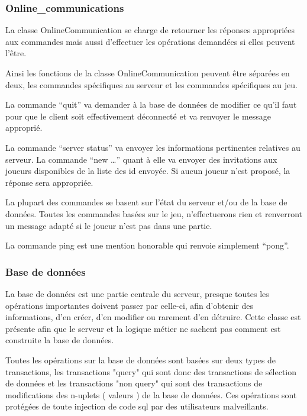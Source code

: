 \documentclass[11pt]{article}
\begin{document}
\subsubsection{Online\_communications}

La classe OnlineCommunication se charge de retourner les réponses appropriées aux commandes mais aussi d’effectuer les opérations demandées si elles peuvent l’être.

Ainsi les fonctions de la classe OnlineCommunication peuvent être séparées en deux, les commandes spécifiques au serveur et les commandes spécifiques au jeu.

La commande “quit” va demander à la base de données de modifier ce qu’il faut pour que le client soit effectivement déconnecté et va renvoyer le message approprié.

La commande “server status” va envoyer les informations pertinentes relatives au serveur.
La commande “new …” quant à elle va envoyer des invitations aux joueurs disponibles de la liste des id envoyée. Si aucun joueur n’est proposé, la réponse sera appropriée.

La plupart des commandes se basent sur l’état du serveur et/ou de la base de données.
Toutes les commandes basées sur le jeu, n’effectuerons rien et renverront un message adapté si le joueur n’est pas dans une partie.

La commande ping est une mention honorable qui renvoie simplement “pong”.

\subsubsection{Base de données}

La base de données est une partie centrale du serveur, presque toutes les opérations importantes doivent passer par celle-ci, afin d’obtenir des informations, d’en créer, d’en modifier ou rarement d’en détruire. 
Cette classe est présente afin que le serveur et la logique métier ne sachent pas comment est construite la base de données.

Toutes les opérations sur la base de données sont basées sur deux types de transactions, les transactions "query" qui sont donc des transactions de sélection de données et les transactions "non query" qui sont des transactions de modifications des n-uplets ( valeurs ) de la base de données. Ces opérations sont protégées de toute injection de code sql par des utilisateurs malveillants.
\end{document}
